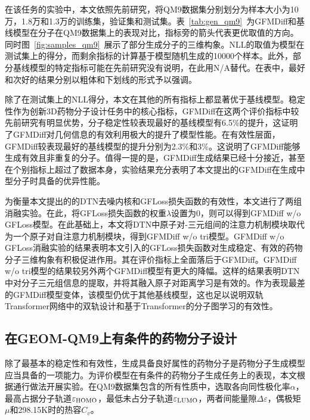 在该任务的实验中，本文依照先前研究，将QM9数据集分别划分为样本大小为10万，1.8万和1.3万的训练集，验证集和测试集。表~\ref{tab:gen_qm9}~为GFMDiff和基线模型在分子在QM9数据集上的表现对比，指标旁的箭头代表更优取值的方向。同时图~\ref{fig:samples_qm9}~展示了部分生成分子的三维构象。NLL的取值为模型在测试集上的得分，而剩余指标的计算基于模型随机生成的10000个样本。此外，部分基线模型的特定指标可能在先前研究没有说明，在此用N/A替代。在表中，最好和次好的结果分别以粗体和下划线的形式予以强调。

除了在测试集上的NLL得分，本文在其他的所有指标上都显著优于基线模型。稳定性作为创新3D药物分子设计任务中的核心指标，GFMDiff在这两个评价指标中较先前研究有明显优势，分子稳定性较表现最好的基线模型有6.5\%的提升，这证明了GFMDiff对几何信息的有效利用极大的提升了模型性能。在有效性层面，GFMDiff较表现最好的基线模型的提升分别为2.3\%和3\%。这说明了GFMDiff能够生成有效且非重复的分子。值得一提的是，GFMDiff生成结果已经十分接近，甚至在个别指标上超过了数据本身，实验结果充分表明了本文提出的GFMDiff在生成中型分子时具备的优异性能。

为衡量本文提出的的DTN去噪内核和GFLoss损失函数的有效性，本文进行了两组消融实验。在此，将GFLoss损失函数的权重$\lambda$设置为0，则可以得到GFMDiff w/o GFLoss模型。在此基础上，本文将DTN中原子对-三元组间的注意力机制模块取代为一个原子对自注意力机制模块，得到GFMDiff w/o tri模型。GFMDiff w/o GFLoss消融实验的结果表明本文引入的GFLoss损失函数对生成稳定、有效的药物分子三维构象有积极促进作用。其在评价指标上全面落后于GFMDiff。GFMDiff w/o tri模型的结果较另外两个GFMDiff模型有更大的降幅。这样的结果表明DTN中对分子三元组信息的提取，并将其融入原子对距离学习是有效的。作为表现最差的GFMDiff模型变体，该模型仍优于其他基线模型，这也足以说明双轨Transformer网络中的双轨设计和基于Transformer的分子图学习的有效性。

\subsection{在GEOM-QM9上有条件的药物分子设计}
除了最基本的稳定性和有效性，生成具备良好属性的药物分子是药物分子生成模型应当具备的一项能力。为评价模型在有条件的药物分子生成任务上的表现，本文根据通行做法开展实验。在QM9数据集包含的所有性质中，选取各向同性极化率$\alpha$，最高占据分子轨道$\varepsilon_{{\rm HOMO}}$，最低未占分子轨道$\varepsilon_{{\rm LUMO}}$，两者间能量隙$\Delta \varepsilon$，偶极矩$\mu$和298.15K时的热容$C_v$。

